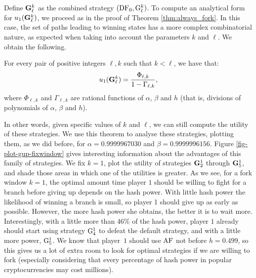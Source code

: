 Define ${\rm {\bf G}}_\ell^k$ as the combined strategy $(\text{\rm DF}_0, {\rm {G}}_\ell^k)$. 
To compute an analytical form for $u_1({\rm {\bf G}}_\ell^k)$, we proceed as in the proof of Theorem \ref{thm:always_fork}. In this case, the set of paths leading to winning states has a more complex combinatorial nature, as expected when taking into account the 
parameters $k$ and $\ell$. We obtain the following.
\begin{theorem}
For every pair of positive integers $\ell, k$ such that $k< \ell$, we have that:
$$u_1({\rm {\bf G}}^k_\ell) = \frac{\Phi_{\ell,k}}{1-\Gamma_{\ell,k}},$$
where $\Phi_{\ell,k}$ and $\Gamma_{\ell,k}$ are rational functions of $\alpha$, $\beta$ and $h$ (that is, divisions of polynomials of  $\alpha$, $\beta$ and $h$).
\end{theorem}
In other words, given specific values of $k$ and $\ell$, we can still compute the utility of these strategies. We use this theorem to analyse these strategies, plotting them, as we did before, 
for $\alpha = 0.9999967030$ and $\beta = 0.9999996156$. Figure \ref{fig-plot-gup-fixwindow} gives 
interesting 
information about the advantages of this family of strategies. 
We fix $k = 1$, plot the utility of strategies ${\rm {\bf G}}^1_2$ through ${\rm {\bf G}}^1_5$, and shade those areas in which one of the utilities is greater. As we see, for a 
fork window $k = 1$, the optimal amount time player $1$ should be willing to fight for a branch before giving up depends on the hash power. With little hash power the likelihood of winning a 
branch is small, so player 1 should give up as early as possible. However, the more hash power she obtains, the better it is to wait more. Interestingly, with a little more than 
$46\%$ of the hash power, player $1$ already should start using strategy ${\rm {G}}^1_4$ to defeat the default strategy, and with a little more power, ${\rm {G}}^1_5$. We know that player~$1$ should use $\text{\rm AF}$ not before 
$h = 0.499$, so this gives us a lot of extra room to look for optimal strategies if we are willing to fork (especially considering that every percentage of hash power in popular cryptocurrencies 
may cost millions).


